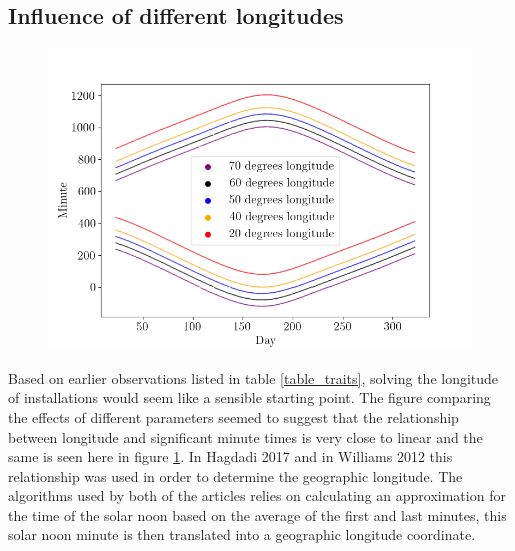 


\newpage

\subsection{Influence of different longitudes}
\label{section_different_longitudes}

\begin{figure}[ht!]
\centering
\includegraphics[width=1\linewidth]{pics/poa_var_lon}
\label{fig-poa_var_lon2}
\end{figure}

\noindent Based on earlier observations listed in table \ref{table_traits}, solving the longitude of installations would seem like a sensible starting point. The figure comparing the effects of different parameters seemed to suggest that the relationship between longitude and significant minute times is very close to linear and the same is seen here in figure \ref{fig-poa_var_lon2}. In Hagdadi 2017 \cite{navid_australian_article} and in Williams 2012 \cite{older_solar_solver_article} this relationship was used in order to determine the geographic longitude. The algorithms used by both of the articles relies on calculating an approximation for the time of the solar noon based on the average of the first and last minutes, this solar noon minute is then translated into a geographic longitude coordinate.



